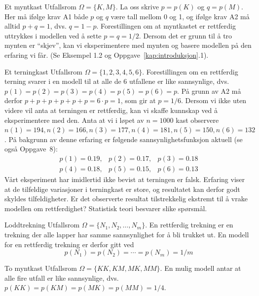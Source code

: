 \begin{eksempel}{Et myntkast}
Utfallsrom $\Omega =\{K, M\}$. La oss skrive $p=p(K)$ og
$q=p(M)$. Her må ifølge krav A1 både $p$ og $q$ være tall mellom
0 og 1, og ifølge krav A2 må alltid $p+q=1$, dvs. $q=1-p$.
Forestillingen om at myntkastet er rettferdig uttrykkes i
modellen ved å sette $p=q=1/2$. Dersom det er grunn til å tro
mynten er ``skjev'', kan vi eksperimentere med mynten og basere
	modellen på den erfaring vi får. (Se Eksempel 1.2 og Oppgave~\ref*{kap:introduksjon}.1).
\end{eksempel}

\begin{eksempel}{Et terningkast}
Utfallsrom $\Omega =\{1,2,3,4,5,6\}$. Forestillingen om en
rettferdig terning svarer i en modell til at alle de 6 utfallene
er like sannsynlige, dvs. $p(1) = p(2) = p(3) = p(4) = p(5) =
p(6) = p$. På grunn av A2 må derfor $p+p+p+p+p+p=6\cdot p=1$, som
gir at $p=1/6$. Dersom vi ikke uten videre vil anta
at terningen er rettferdig, kan vi skaffe kunnskap ved å
eksperimentere med den. Anta at vi i løpet av $n=1000$ kast 
observere $n(1) = 194, n(2) = 166, n(3) = 177, n(4) = 181, n(5) =
150, n(6) = 132$. På bakgrunn av denne erfaring er følgende
sannsynlighetsfunksjon aktuell (se også Oppgave~8):
\begin{eqnarray*}
     p(1) = 0.19,& p(2) = 0.17,& p(3) = 0.18 \\ 
     p(4) = 0.18,& p(5) = 0.15,& p(6) = 0.13
\end{eqnarray*}
\noindent Vårt eksperiment har imidlertid ikke bevist at terningen er
falsk. Erfaring viser at de tilfeldige variasjoner i terningkast
er store, og resultatet kan derfor godt skyldes tilfeldigheter.
Er det observerte resultat tilstrekkelig ekstremt til å vrake
modellen om rettferdighet? Statistisk teori besvarer slike
spørsmål.
\end{eksempel}

\begin{eksempel}{Loddtrekning}
Utfallsrom $\Omega = \{N_1, N_2, \ldots, N_m\}$. En rettferdig
trekning er en trekning der alle lapper har samme sannsynlighet
for å bli trukket ut. En modell for en rettferdig trekning er
derfor gitt ved
\[  p(N_1) = p(N_2) = \cdots = p(N_m) = 1/m \]
\end{eksempel}

\begin{eksempel}{To myntkast}
Utfallsrom $\Omega =\{KK, KM, MK, MM\}$. En mulig modell 
antar at alle fire utfall er like sannsynlige, dvs. $p(KK) = p(KM)
= p(MK) = p(MM) = 1/4$.
\end{eksempel}

